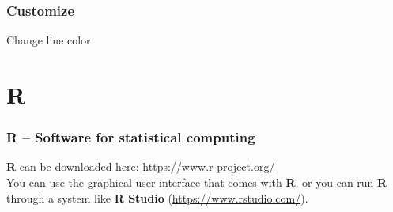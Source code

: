 \documentclass[color=usenames,dvipsnames]{beamer}\usepackage[]{graphicx}\usepackage[]{color}
\begin{document}
\begin{frame}
  \frametitle{Customize}
    \begin{center}
      Change line color
    \end{center}
\end{frame}



\section{R}


\begin{frame}[fragile]
  \frametitle{R -- Software for statistical computing}
  {\bf R} can be downloaded here: \url{https://www.r-project.org/} \\
  \pause
  \vfill
  You can use the graphical user interface that comes with {\bf R}, or you
  can run {\bf R} through a system like {\bf R Studio} (\url{https://www.rstudio.com/}).
\end{frame}
\end{document}
